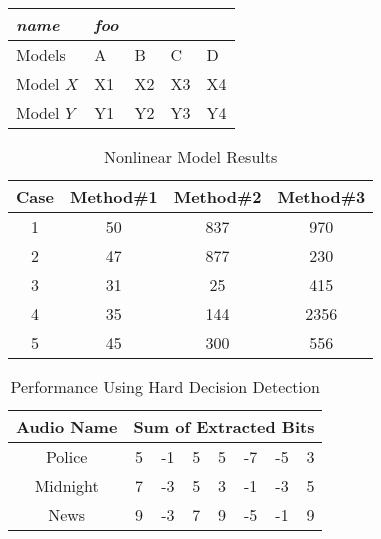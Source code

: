 \documentclass[a4j]{jarticle}
\begin{document}
\begin{tabular}{@{} *5l @{}}    \toprule
    \emph{name} & \emph{foo} &&&  \\\midrule
    Models    & A  & B  & C  & D  \\ 
     Model $X$ & X1 & X2 & X3 & X4\\ 
     Model $Y$ & Y1 & Y2 & Y3 & Y4\\\bottomrule
     \hline
\end{tabular}

\begin{table}[ht]
    \caption{Nonlinear Model Results} %
    \centering %
    \begin{tabular}{c c c c} %
    \hline\hline %
    Case & Method\#1 & Method\#2 & Method\#3 \\ [0.5ex] %
    \hline %
    1 & 50 & 837 & 970 \\ %
    2 & 47 & 877 & 230 \\
    3 & 31 & 25 & 415 \\
    4 & 35 & 144 & 2356 \\
    5 & 45 & 300 & 556 \\ [1ex] %
    \hline %
    \end{tabular}
    \label{table:nonlin} %
    \end{table}

    \begin{table}[h]
        \caption{Performance Using Hard Decision Detection} %
        \centering %
        \begin{tabular}{c rrrrrrr} %
        \hline\hline %
        Audio Name&\multicolumn{7}{c}{Sum of Extracted Bits} \\ [0.5ex]
        \hline %
        Police & 5 & -1 & 5& 5& -7& -5& 3\\ %
        Midnight & 7 & -3 & 5& 3& -1& -3& 5\\
        News & 9 & -3 & 7& 9& -5& -1& 9\\[1ex] %
        \hline %
        \end{tabular}
        \label{tab:hresult}
        \end{table}
\end{document}
